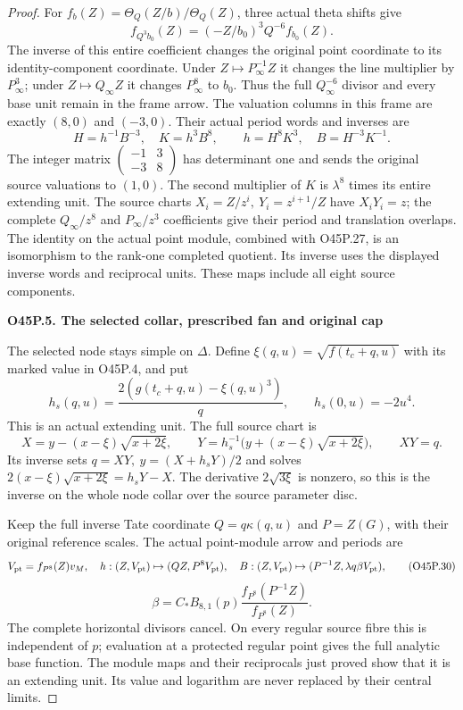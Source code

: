 \begin{proof}
For \(f_b(Z)=\Theta_Q(Z/b)/\Theta_Q(Z)\), three actual theta
shifts give
\[
 f_{Q^3b_0}(Z)=(-Z/b_0)^3Q^{-6}f_{b_0}(Z).
 \tag{O45P.26}
\]
The inverse of this entire coefficient changes the original
point coordinate to its identity-component coordinate.
Under \(Z\mapsto P_\infty^{-1}Z\) it changes the line
multiplier by \(P_\infty^3\); under \(Z\mapsto Q_\infty Z\)
it changes \(P_\infty^8\) to \(b_0\).
Thus the full \(Q_\infty^{-6}\) divisor and every base unit
remain in the frame arrow. The valuation columns in this frame
are exactly \((8,0)\) and \((-3,0)\).
Their actual period words and inverses are
\[
 H=h^{-1}B^{-3},\quad K=h^3B^8,\qquad
 h=H^8K^3,\quad B=H^{-3}K^{-1}.
 \tag{O45P.27}
\]
The integer matrix
\(\left(\begin{smallmatrix}-1&3\\-3&8\end{smallmatrix}\right)\)
has determinant one and sends the original source valuations to
\((1,0)\). The second multiplier of \(K\) is \(\lambda^8\)
times its entire extending unit.
The source charts \(X_i=Z/z^i,\ Y_i=z^{i+1}/Z\) have
\(X_iY_i=z\); the complete \(Q_\infty/z^8\) and
\(P_\infty/z^3\) coefficients give their period and translation
overlaps. The identity on the actual point module, combined
with O45P.27, is an isomorphism to the rank-one completed
quotient. Its inverse uses the displayed inverse words and
reciprocal units. These maps include all eight source components.

\par

\medskip\noindent\textbf{O45P.5. The selected collar, prescribed fan and original cap}

\par\nobreak

The selected node stays simple on \(\Delta\). Define
\(\xi(q,u)=\sqrt{f(t_c+q,u)}\) with its marked value in O45P.4,
and put
\[
 h_s(q,u)=\frac{2(g(t_c+q,u)-\xi(q,u)^3)}q,\qquad
 h_s(0,u)=-2u^4.
 \tag{O45P.28}
\]
This is an actual extending unit. The full source chart is
\[
 X=y-(x-\xi)\sqrt{x+2\xi},\qquad
 Y=h_s^{-1}\bigl(y+(x-\xi)\sqrt{x+2\xi}\bigr),\qquad XY=q.
 \tag{O45P.29}
\]
Its inverse sets \(q=XY,\ y=(X+h_sY)/2\) and solves
\(2(x-\xi)\sqrt{x+2\xi}=h_sY-X\). The derivative
\(2\sqrt{3\xi}\) is nonzero, so this is the inverse on the
whole node collar over the source parameter disc.

Keep the full inverse Tate coordinate
\(Q=q\kappa(q,u)\) and \(P=Z(G)\), with their original
reference scales. The actual point-module arrow and periods are
\[
 V_{\rm pt}=f_{P^8}(Z)v_M,\quad
 h:(Z,V_{\rm pt})\mapsto(QZ,P^8V_{\rm pt}),\quad
 B:(Z,V_{\rm pt})\mapsto(P^{-1}Z,\lambda q\beta V_{\rm pt}),
 \tag{O45P.30}
\]
\[
 \beta=C_*B_{8,1}(p)
       \frac{f_{P^8}(P^{-1}Z)}{f_{P^8}(Z)}.
 \tag{O45P.31}
\]
The complete horizontal divisors cancel. On every regular
source fibre this is independent of \(p\); evaluation at a
protected regular point gives the full analytic base function.
The module maps and their reciprocals just proved show that
it is an extending unit. Its value and logarithm are never
replaced by their central limits.


\end{proof}
